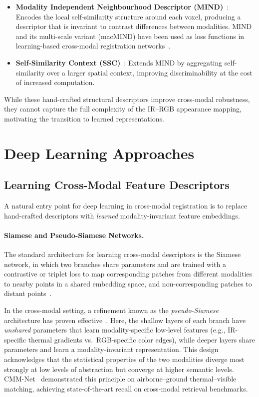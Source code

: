 \begin{itemize}
  \item \textbf{Modality Independent Neighbourhood Descriptor (MIND)}~\cite{
    heinrich2012mind}: Encodes the local self-similarity structure around each
    voxel, producing a descriptor that is invariant to contrast differences
    between modalities. MIND and its multi-scale variant (macMIND) have been
    used as loss functions in learning-based cross-modal registration
    networks~\cite{macjnet2023}.
  \item \textbf{Self-Similarity Context (SSC)}~\cite{heinrich2013towards}:
    Extends MIND by aggregating self-similarity over a larger spatial context,
    improving discriminability at the cost of increased computation.
\end{itemize}

While these hand-crafted structural descriptors improve cross-modal robustness,
they cannot capture the full complexity of the IR--RGB appearance mapping,
motivating the transition to learned representations.


\section{Deep Learning Approaches}
\label{sec:deep-learning-approaches}

\subsection{Learning Cross-Modal Feature Descriptors}
\label{subsec:learned-descriptors}

A natural entry point for deep learning in cross-modal registration is to
replace hand-crafted descriptors with \emph{learned} modality-invariant feature
embeddings.

\paragraph{Siamese and Pseudo-Siamese Networks.}
The standard architecture for learning cross-modal descriptors is the Siamese
network, in which two branches share parameters and are trained with a
contrastive or triplet loss to map corresponding patches from different
modalities to nearby points in a shared embedding space, and non-corresponding
patches to distant points~\cite{zagoruyko2015learning}.

In the cross-modal setting, a refinement known as the \emph{pseudo-Siamese}
architecture has proven effective~\cite{cmm-net2021}. Here, the shallow layers
of each branch have \emph{unshared} parameters that learn modality-specific
low-level features (e.g., IR-specific thermal gradients vs.\ RGB-specific color
edges), while deeper layers share parameters and learn a modality-invariant
representation. This design acknowledges that the statistical properties of
the two modalities diverge most strongly at low levels of abstraction but
converge at higher semantic levels. CMM-Net~\cite{cmm-net2021} demonstrated
this principle on airborne--ground thermal--visible matching, achieving
state-of-the-art recall on cross-modal retrieval benchmarks.

